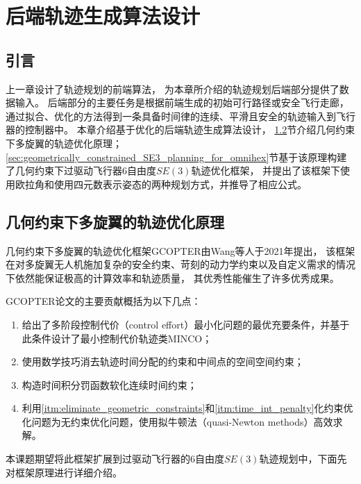 
\chapter{后端轨迹生成算法设计}\label{chap:back_end_trajectory_generation}

\section{引言}\label{sec:intro_4}
上一章设计了轨迹规划的前端算法，
为本章所介绍的轨迹规划后端部分提供了数据输入。
后端部分的主要任务是根据前端生成的初始可行路径或安全飞行走廊，
通过拟合、优化的方法得到一条具备时间律的连续、平滑且安全的轨迹输入到飞行器的控制器中。
本章介绍基于优化的后端轨迹生成算法设计，
\ref{sec:geometrically_constrained_trajectory_optimization}节介绍几何约束下多旋翼的轨迹优化原理；
\ref{sec:geometrically_constrained_SE3_planning_for_omnihex}节基于该原理构建了几何约束下过驱动飞行器6自由度$SE(3)$轨迹优化框架，
并提出了该框架下使用欧拉角和使用四元数表示姿态的两种规划方式，并推导了相应公式。

\section{几何约束下多旋翼的轨迹优化原理}\label{sec:geometrically_constrained_trajectory_optimization}
几何约束下多旋翼的轨迹优化框架GCOPTER\cite{2021Geometrically}由Wang等人于2021年提出，
该框架在对多旋翼无人机施加复杂的安全约束、苛刻的动力学约束以及自定义需求的情况下依然能保证极高的计算效率和轨迹质量，
其优秀性能催生了许多优秀成果\cite{2021Fast, zhou2022swarm}。

GCOPTER论文的主要贡献概括为以下几点：
\begin{enumerate}
  \renewcommand{\labelenumi}{(\theenumi)}
  \item 给出了多阶段控制代价（control effort）最小化问题的最优充要条件，并基于此条件设计了最小控制代价轨迹类MINCO；
  \item 使用数学技巧消去轨迹时间分配的约束和中间点的空间空间约束；\label{itm:eliminate_geometric_constraints}
  \item 构造时间积分罚函数软化连续时间约束；\label{itm:time_int_penalty}
  \item 利用\ref{itm:eliminate_geometric_constraints}和\ref{itm:time_int_penalty}化约束优化问题为无约束优化问题，使用拟牛顿法（quasi-Newton methods）高效求解。
\end{enumerate}
本课题期望将此框架扩展到过驱动飞行器的6自由度$SE(3)$轨迹规划中，下面先对框架原理进行详细介绍。

